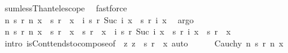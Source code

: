 \begin{isabellebody}
\ sum{\isacharunderscore}{\kern0pt}lessThan{\isacharunderscore}{\kern0pt}telescope\ \isamarkupfalse%
\ fastforce\isanewline
\ \ \ \ \isamarkupfalse%
\ \isamarkupfalse%
\ {\isachardoublequoteopen}{\isacharparenleft}{\kern0pt}{\isasymlambda}n{\isachardot}{\kern0pt}\ s\ {\isacharparenleft}{\kern0pt}r\ n{\isacharparenright}{\kern0pt}\ x\ {\isacharminus}{\kern0pt}\ s\ {\isacharparenleft}{\kern0pt}r\ {}{\isacharparenright}{\kern0pt}\ x{\isacharparenright}{\kern0pt}\ {\isasymlonglonglongrightarrow}\ {\isacharparenleft}{\kern0pt}{\isasymSum}i{\isachardot}{\kern0pt}\ s\ {\isacharparenleft}{\kern0pt}r\ {\isacharparenleft}{\kern0pt}Suc\ i{\isacharparenright}{\kern0pt}{\isacharparenright}{\kern0pt}\ x\ {\isacharminus}{\kern0pt}\ s\ {\isacharparenleft}{\kern0pt}r\ i{\isacharparenright}{\kern0pt}\ x{\isacharparenright}{\kern0pt}{\isachardoublequoteclose}\ \isamarkupfalse%
\ argo\isanewline
\ \ \ \ \isamarkupfalse%
\ {\isachardoublequoteopen}{\isacharparenleft}{\kern0pt}{\isasymlambda}n{\isachardot}{\kern0pt}\ s\ {\isacharparenleft}{\kern0pt}r\ n{\isacharparenright}{\kern0pt}\ x\ {\isacharminus}{\kern0pt}\ s\ {\isacharparenleft}{\kern0pt}r\ {}{\isacharparenright}{\kern0pt}\ x\ {\isacharplus}{\kern0pt}\ s\ {\isacharparenleft}{\kern0pt}r\ {}{\isacharparenright}{\kern0pt}\ x{\isacharparenright}{\kern0pt}\ {\isasymlonglonglongrightarrow}\ {\isacharparenleft}{\kern0pt}{\isasymSum}i{\isachardot}{\kern0pt}\ s\ {\isacharparenleft}{\kern0pt}r\ {\isacharparenleft}{\kern0pt}Suc\ i{\isacharparenright}{\kern0pt}{\isacharparenright}{\kern0pt}\ x\ {\isacharminus}{\kern0pt}\ s\ {\isacharparenleft}{\kern0pt}r\ i{\isacharparenright}{\kern0pt}\ x{\isacharparenright}{\kern0pt}\ {\isacharplus}{\kern0pt}\ s\ {\isacharparenleft}{\kern0pt}r\ {}{\isacharparenright}{\kern0pt}\ x{\isachardoublequoteclose}\ \isamarkupfalse%
\ {\isacharparenleft}{\kern0pt}intro\ isCont{\isacharunderscore}{\kern0pt}tendsto{\isacharunderscore}{\kern0pt}compose{\isacharbrackleft}{\kern0pt}of\ {\isacharunderscore}{\kern0pt}\ {\isachardoublequoteopen}{\isasymlambda}z{\isachardot}{\kern0pt}\ z\ {\isacharplus}{\kern0pt}\ s\ {\isacharparenleft}{\kern0pt}r\ {}{\isacharparenright}{\kern0pt}\ x{\isachardoublequoteclose}{\isacharbrackright}{\kern0pt}{\isacharcomma}{\kern0pt}\ auto{\isacharparenright}{\kern0pt}\isanewline
\ \ \ \ \isamarkupfalse%
\ {\isachardoublequoteopen}Cauchy\ {\isacharparenleft}{\kern0pt}{\isasymlambda}n{\isachardot}{\kern0pt}\ s\ {\isacharparenleft}{\kern0pt}r\ n{\isacharparenright}{\kern0pt}\ x{\isacharparenright}{\kern0pt}{\isachardoublequoteclose}\ \isamarkupfalse%

\end{isabellebody}
